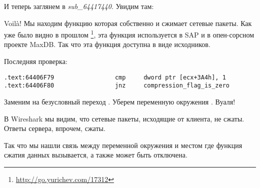 И теперь заглянем в \emph{sub\_64417440}. Увидим там:



Voilà! Мы находим функцию которая собственно и сжимает сетевые пакеты.
Как уже было видно в прошлом
\footnote{\url{http://go.yurichev.com/17312}},
эта функция используется в SAP и в опен-сорсном проекте MaxDB.
Так что эта функция доступна в виде исходников.

Последняя проверка:

\begin{lstlisting}[style=customasmx86]
.text:64406F79                 cmp     dword ptr [ecx+3A4h], 1
.text:64406F80                 jnz     compression_flag_is_zero
\end{lstlisting}

Заменим \JNZ на безусловный переход \JMP. Уберем переменную окружения \TDWNC. Вуаля!

В Wireshark мы видим, что сетевые пакеты, исходящие от клиента, не сжаты. Ответы сервера, впрочем, сжаты.

Так что мы нашли связь между переменной окружения и местом где функция сжатия данных вызывается, а также
может быть отключена.


